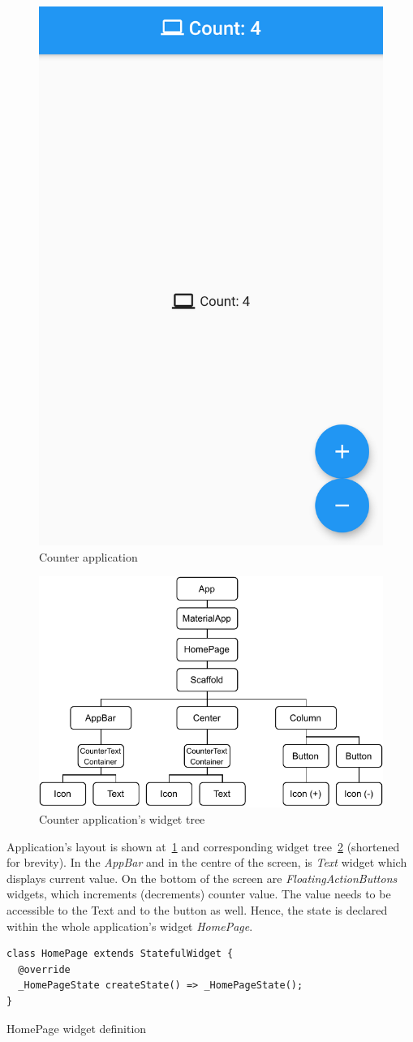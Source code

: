 \begin{figure}[htp]
    \centering
    \includegraphics[width=0.33\linewidth]{img/flutter/counter_app_base.png}
    \caption{Counter application}
    \label{fig:counter-app}
\end{figure}

\begin{figure}[htp]
    \centering
    \includegraphics[width=0.6\linewidth]{img/flutter/counter-base.pdf}
    \caption{Counter application's widget tree}
    \label{fig:counter-app-widget-tree}
\end{figure}

Application's layout is shown at~\cref{fig:counter-app} and corresponding widget tree~\cref{fig:counter-app-widget-tree} (shortened for brevity). In the \textit{AppBar} and in the centre of the screen, is \textit{Text} widget which displays current value. On the bottom of the screen are \textit{FloatingActionButtons} widgets, which increments (decrements) counter value. The value needs to be accessible to the Text and to the button as well. Hence, the state is declared within the whole application's widget \textit{HomePage}.  

\begin{listing}[ht]
\begin{verbatim}
class HomePage extends StatefulWidget {
  @override
  _HomePageState createState() => _HomePageState();
}
\end{verbatim}
\caption{HomePage widget definition}
\label{listing:counter-homepage-widget}
\end{listing}

